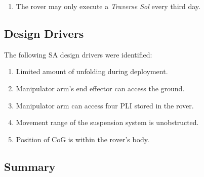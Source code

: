 \begin{enumerate}[label=\textbf{\textcolor{BulletBlue}{C-\arabic*}}]
    \item The rover may only execute a \textit{Traverse Sol} every third day.
\end{enumerate}

\subsection{Design Drivers}
\label{sec:Design:RequirementsAndDesignDrivers:DesignDrivers}
The following \ac{SA} design drivers were identified:

\begin{enumerate}[label=\textbf{\textcolor{BulletBlue}{D-\arabic*}}]
    \item Limited amount of unfolding during deployment.
    \item Manipulator arm's end effector can access the ground.
    \item Manipulator arm can access four \ac{PLI} stored in the rover.
    \item Movement range of the suspension system is unobstructed.
    \item Position of \ac{CoG} is within the rover's body.
\end{enumerate}

\subsection{Summary}
\label{sec:Design:RequirementsAndDesignDrivers:Summary}
